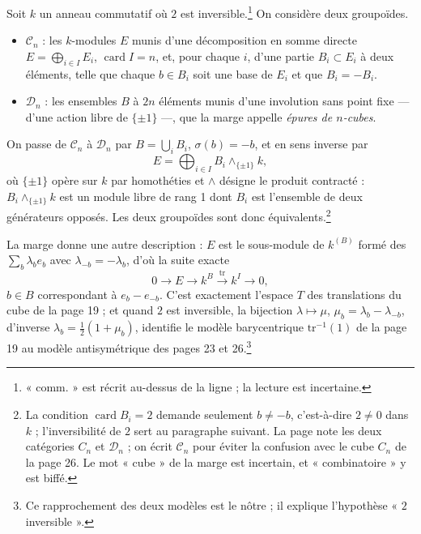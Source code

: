 \documentclass[11pt,a4paper]{article}
\begin{document}
Soit $k$ un anneau commutatif où $2$ est inversible.\footnote{« comm. » est
récrit au-dessus de la ligne ; la lecture est incertaine.} On considère deux
groupoïdes.
\begin{itemize}
\item $\mathcal{C}_{n}$ : les $k$-modules $E$ munis d'une décomposition en somme
directe $E = \bigoplus_{i \in I} E_{i}$, $\operatorname{card} I = n$, et, pour
chaque $i$, d'une partie $B_{i} \subset E_{i}$ à deux éléments, telle que chaque
$b \in B_{i}$ soit une base de $E_{i}$ et que $B_{i} = -B_{i}$.
\item $\mathcal{D}_{n}$ : les ensembles $B$ à $2n$ éléments munis d'une
involution sans point fixe --- d'une action libre de $\{\pm 1\}$ ---, que la
marge appelle \emph{épures de $n$-cubes}.
\end{itemize}
On passe de $\mathcal{C}_{n}$ à $\mathcal{D}_{n}$ par $B = \bigcup_{i} B_{i}$,
$\sigma(b) = -b$, et en sens inverse par
\[
  E = \bigoplus_{i \in I} B_{i} \wedge_{\{\pm 1\}} k ,
\]
où $\{\pm 1\}$ opère sur $k$ par homothéties et $\wedge$ désigne le produit
contracté : $B_{i} \wedge_{\{\pm 1\}} k$ est un module libre de rang 1 dont $B_{i}$
est l'ensemble de deux générateurs opposés. Les deux groupoïdes sont donc
équivalents.\footnote{La condition $\operatorname{card} B_{i} = 2$ demande
seulement $b \neq -b$, c'est-à-dire $2 \neq 0$ dans $k$ ; l'inversibilité de $2$
sert au paragraphe suivant. La page note les deux catégories $C_{n}$ et
$\mathcal{D}_{n}$ ; on écrit $\mathcal{C}_{n}$ pour éviter la confusion avec le
cube $C_{n}$ de la page 26. Le mot « cube » de la marge est incertain, et
« combinatoire » y est biffé.}

La marge donne une autre description : $E$ est le sous-module de $k^{(B)}$ formé
des $\sum_{b} \lambda_{b} e_{b}$ avec $\lambda_{-b} = -\lambda_{b}$, d'où la suite
exacte
\[
  0 \to E \to k^{B} \xrightarrow{\ \mathrm{tr}\ } k^{I} \to 0 ,
\]
$b \in B$ correspondant à $e_{b} - e_{-b}$. C'est exactement l'espace $T$ des
translations du cube de la page 19 ; et quand $2$ est inversible, la bijection
$\lambda \mapsto \mu$, $\mu_{b} = \lambda_{b} - \lambda_{-b}$, d'inverse
$\lambda_{b} = \frac{1}{2}(1 + \mu_{b})$, identifie le modèle barycentrique
$\mathrm{tr}^{-1}(1)$ de la page 19 au modèle antisymétrique des pages 23 et
26.\footnote{Ce rapprochement des deux modèles est le nôtre ; il explique
l'hypothèse « $2$ inversible ».}
\end{document}
